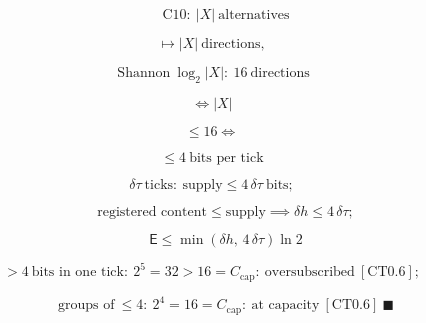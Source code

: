 \begin{corollary}
\[
\qquad \mathrm{C10}:\ |X|\ \text{alternatives}
\]

\[
\mapsto |X|\ \text{directions},
\]

\[
\ \text{Shannon}\ \log_2|X|:\ 16\ \text{directions}
\]

\[
\iff |X|
\]

\[
\le 16\iff
\]

\[
\le 4\ \text{bits per tick}
\]

\[
\delta\tau\ \text{ticks}:\ \text{supply}\le4\,\delta\tau\ \text{bits};
\]

\[
\qquad \text{registered content}\le\text{supply}\implies\delta h\le4\,\delta\tau;
\]

\[
\qquad \mathsf E\le\min(\delta h,\,4\,\delta\tau)\ln2
\]

\[
>4\ \text{bits in one tick}:\ 2^{5}=32>16=C_{\mathrm{cap}}:\ \text{oversubscribed}\ [\mathrm{CT0.6}];
\]

\[
\qquad \text{groups of}\ \le4:\ 2^{4}=16=C_{\mathrm{cap}}:\ \text{at capacity}\ [\mathrm{CT0.6}]\ \blacksquare
\]

\end{corollary}

